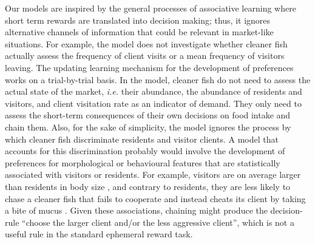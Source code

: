 \documentclass[]{rsos}%
\begin{document}
Our models are inspired by the general processes of associative learning
where short term rewards are translated into decision making; thus, it
ignores alternative channels of information that could be relevant in
market-like situations. For example, the model does not investigate whether
cleaner fish actually assess the frequency of client visits or a mean frequency
of visitors leaving. The updating learning mechanism for the development
of preferences works on a trial-by-trial basis. In the model, cleaner fish
do not need to assess the actual state of the market, \emph{i.e.} their abundance,
the abundance of residents and visitors, and client visitation rate as an
indicator of demand. They only need to assess the short-term
consequences of their own decisions on food intake and chain them.
Also, for the sake of simplicity, the model ignores
the process by which cleaner fish discriminate
residents and visitor clients. A model that accounts for this discrimination
probably would involve the development of preferences for morphological or
behavioural features that are statistically associated with visitors
or residents. For example, visitors are on average larger
than residents in body size \citep{bshary_Cleaner_2001}, and contrary to
residents, they are less likely to chase a cleaner fish that fails to cooperate
and instead cheats its client by taking a bite of mucus
\citep{bshary_Asymmetric_2002}. Given these associations, chaining might
produce the decision-rule ``choose the larger client and/or the less aggressive
client'', which is not a useful rule in the standard ephemeral reward task.
\end{document}
